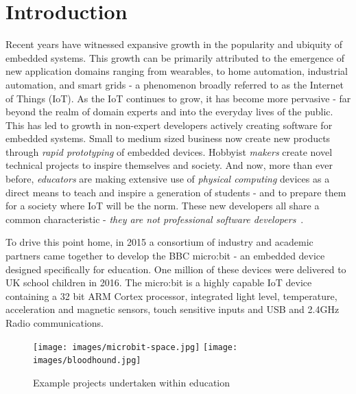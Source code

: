 \section{Introduction}
\label{sec:intro}

Recent years have witnessed expansive growth in the popularity and ubiquity of embedded systems. This growth can be primarily attributed to the emergence of new application domains ranging from wearables, to home automation, industrial automation, and smart grids - a phenomenon broadly referred to as the Internet of Things (IoT). As the IoT continues to grow, it has become more pervasive - far beyond the realm of domain experts and into the everyday lives of the public. This has led to growth in non-expert developers actively creating software for embedded systems. Small to medium sized business now create new products through \emph{rapid prototyping} of embedded devices. Hobbyist \emph{makers} create novel technical projects to inspire themselves and society. And now, more than ever before, \emph{educators} are making extensive use of \emph{physical computing} devices as a direct means to teach and inspire a generation of students - and to prepare them for a society where IoT will be the norm. These new developers all share a common characteristic - \emph{they are not professional software developers}~\cite{dougherty2012maker,bruce2015make,maksimovic2014raspberry}.

To drive this point home, in 2015 a consortium of industry and academic partners came together to develop the BBC micro:bit - an embedded device designed specifically for education. One million of these devices were delivered to UK school children in 2016. The micro:bit is a highly capable IoT device containing a 32 bit ARM Cortex processor, integrated light level, temperature, acceleration and magnetic sensors, touch sensitive inputs and USB and 2.4GHz Radio communications.

\begin{figure}[t]
    \centering
    \texttt{[image: images/microbit-space.jpg]}
    \texttt{[image: images/bloodhound.jpg]}
    \setlength{\belowcaptionskip}{-10pt}
    \caption{\label{fig:projects} Example projects undertaken within education}
    \vspace{-5pt}
\end{figure}

